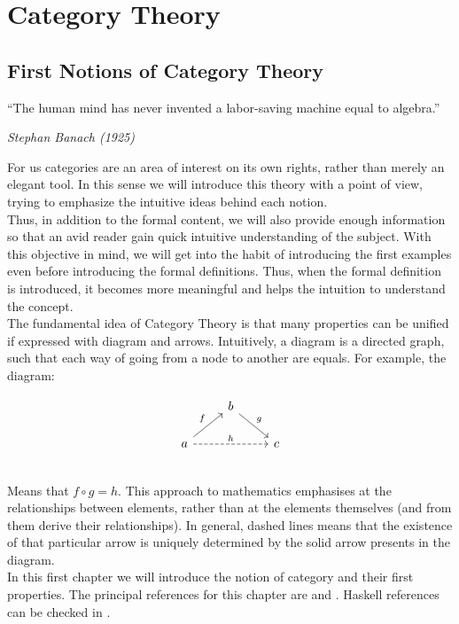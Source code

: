 
\part{Category Theory}
\label{Part1}



\chapter{First Notions of Category Theory}

\epigraph{“The human mind has never invented a labor-saving machine equal to algebra.” }{\textit{Stephan Banach (1925)}}

For us categories are an area of interest on its own rights, rather than merely an elegant tool. In this sense we will introduce this theory with a point of view, trying to emphasize the intuitive ideas behind each notion.\\

Thus, in addition to the formal content, we will also provide enough information so that an avid reader gain quick intuitive understanding of the subject. With this objective in mind, we will get into the habit of introducing the first examples even before introducing the formal definitions. Thus, when the formal definition is introduced, it becomes more meaningful and helps the intuition to understand the concept.\\

The fundamental idea of Category Theory is that many properties can be unified if expressed with diagram and arrows. Intuitively, a diagram is a directed graph, such that each way of going from a node to another are equals. For example, the diagram:

\[
  \begin{tikzcd}
    & b \arrow[rd, "g"]& \\
    a\arrow[ru, "f"] \arrow[rr, "h", dashed] && c\\
  \end{tikzcd}
\]
Means that $f\circ g = h$. This approach to mathematics emphasises  at the relationships between elements, rather than at the elements themselves (and from them derive their relationships). In general, dashed lines means that the existence of that particular arrow is uniquely determined by the solid arrow presents in the diagram.\\

In this first chapter we will introduce the notion of category and their first properties. The principal references for this chapter are \cite{mac2013categories} and \cite{riehl2017category}. Haskell references can be checked in \cite{milewski2018category}.

